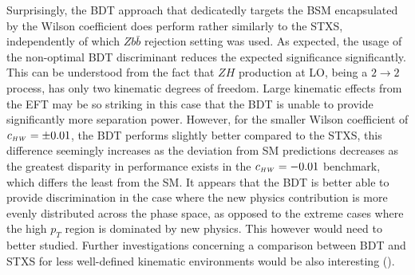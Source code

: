 Surprisingly, the BDT approach that dedicatedly targets the BSM encapsulated by the Wilson coefficient does perform rather similarly to the STXS, independently of which $Z b\bar{b}$ rejection setting was used. As expected, the usage of the non-optimal BDT discriminant reduces the expected significance significantly. This can be understood from the fact that $ZH$ production at LO, being a $2\to2$ process, has only two kinematic degrees of freedom. Large kinematic effects from the EFT may be so striking in this case that the BDT is unable to provide significantly more separation power. However, for the smaller Wilson coefficient of $c_{\scriptscriptstyle HW} = \pm0.01$, the BDT performs slightly better compared to the STXS, this difference seemingly increases as the deviation from SM predictions decreases as the greatest disparity in performance exists in the $c_{\scriptscriptstyle HW} = -0.01$ benchmark, which differs the least from the SM. It appears that the BDT is better able to provide discrimination in the case where the new physics contribution is more evenly distributed across the phase space, as opposed to the extreme cases where the high $p_T$ region is dominated by new physics. This however would need to better studied. Further investigations concerning a comparison between BDT and STXS for less well-defined kinematic environments would be also interesting ().



